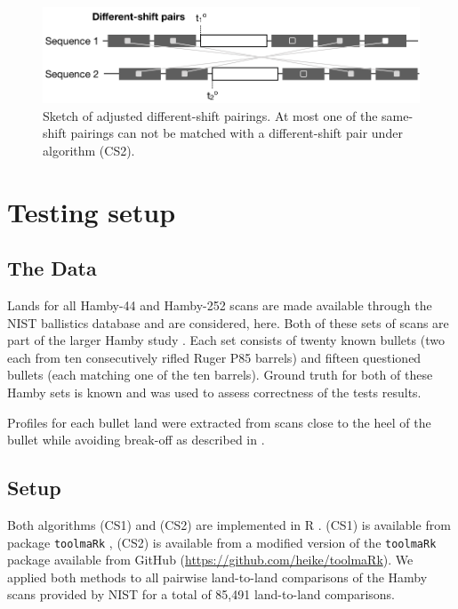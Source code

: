 \documentclass[12pt]{article}
\begin{document}
\begin{figure}[hbtp]
\centering
\includegraphics[width=.7\textwidth]{images/sketch-diff-2.png}
\caption{\label{sketch-diff-2}Sketch of adjusted different-shift pairings. At most one of the same-shift pairings can not be matched with a different-shift pair under algorithm (CS2). }
\end{figure}

\hypertarget{testing-setup}{%
\section{Testing setup}\label{testing-setup}}

\hypertarget{the-data}{%
\subsection{The Data}\label{the-data}}

Lands for all Hamby-44 and Hamby-252 scans are made available through
the NIST ballistics database \citep{nist} and are considered, here. Both
of these sets of scans are part of the larger Hamby study \citep{hamby}.
Each set consists of twenty known bullets (two each from ten
consecutively rifled Ruger P85 barrels) and fifteen questioned bullets
(each matching one of the ten barrels). Ground truth for both of these
Hamby sets is known and was used to assess correctness of the tests
results.

Profiles for each bullet land were extracted from scans close to the
heel of the bullet while avoiding break-off as described in
\citet{aoas}.

\hypertarget{setup}{%
\subsection{Setup}\label{setup}}

Both algorithms (CS1) and (CS2) are implemented in R \citep{R}. (CS1) is
available from package \texttt{toolmaRk} \citep{toolmark}, (CS2) is
available from a modified version of the \texttt{toolmaRk} package
available from GitHub (\url{https://github.com/heike/toolmaRk}). We
applied both methods to all pairwise land-to-land comparisons of the
Hamby scans provided by NIST for a total of 85,491 land-to-land
comparisons.
\end{document}
